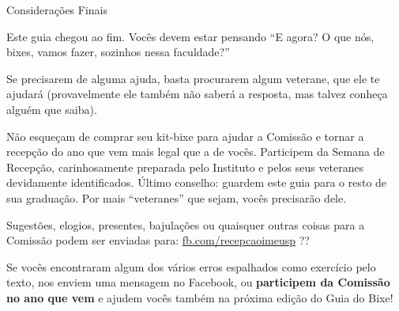 \begin{secao}{Considerações Finais}

Este guia chegou ao fim. Vocês devem estar pensando ``E agora? O que nós, bixes,
vamos fazer, sozinhos nessa faculdade?''

Se precisarem de alguma ajuda, basta procurarem algum veterane, que ele te
ajudará (provavelmente ele também não saberá a resposta, mas talvez conheça
alguém que saiba).

Não esqueçam de comprar seu kit-bixe para ajudar a Comissão e tornar a recepção
do ano que vem mais legal que a de vocês. Participem da Semana de Recepção,
carinhosamente preparada pelo Instituto e pelos seus veteranes devidamente
identificados. Último conselho: guardem este guia para o resto de sua graduação.
Por mais ``veteranes'' que sejam, vocês precisarão dele.

Sugestões, elogios, presentes, bajulações ou quaisquer outras coisas para a
Comissão podem ser enviadas para: \url{fb.com/recepcaoimeusp} ??

Se vocês encontraram algum dos vários erros espalhados como exercício pelo texto,
nos enviem uma mensagem no Facebook, ou \textbf{participem da Comissão no ano que vem}
e ajudem vocês também na próxima edição do Guia do Bixe!

\end{secao}
